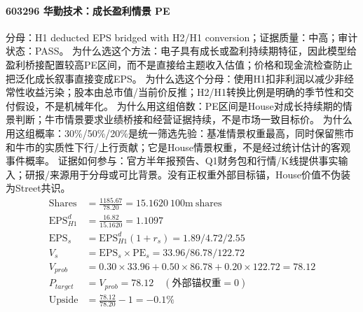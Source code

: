 \paragraph{603296 华勤技术：成长盈利情景 PE}
分母：H1 deducted EPS bridged with H2/H1 conversion；证据质量：中高；审计状态：PASS。
为什么选这个方法：电子具有成长或盈利持续期特征，因此模型给盈利桥接配置较高PE区间，而不是直接给主题收入估值；价格和现金流检查防止把泛化成长叙事直接变成EPS。
为什么选这个分母：使用H1扣非利润以减少非经常性收益污染；股本由总市值/当前价反推；H2/H1转换比例是明确的季节性和交付假设，不是机械年化。
为什么用这组倍数：PE区间是House对成长持续期的情景判断；牛市情景要求业绩桥接和经营证据持续，不是市场一致目标价。
为什么用这组概率：30\%/50\%/20\%是统一筛选先验：基准情景权重最高，同时保留熊市和牛市的实质性下行/上行贡献；它是House情景权重，不是经过统计估计的客观事件概率。
证据如何参与：官方半年报预告、Q1财务包和行情/K线提供事实输入；研报/来源用于分母或可比背景。没有正权重外部目标锚，House价值不伪装为Street共识。
\begin{align*}
\mathrm{Shares} &= \frac{1185.67}{78.20}=15.1620\ \mathrm{100m\ shares}\\
\mathrm{EPS}_{H1}^d &= \frac{16.82}{15.1620}=1.1097\\
\mathrm{EPS}_s &= \mathrm{EPS}_{H1}^d(1+r_s)=1.89/4.72/2.55\\
V_s &= \mathrm{EPS}_s\times \mathrm{PE}_s=33.96/86.78/122.72\\
V_{prob} &= 0.30\times 33.96+0.50\times 86.78+0.20\times 122.72=78.12\\
P_{target} &= V_{prob}=78.12\quad(\text{外部锚权重}=0)\\
\mathrm{Upside} &= \frac{78.12}{78.20}-1=-0.1\%\\
\end{align*}

\normalsize
